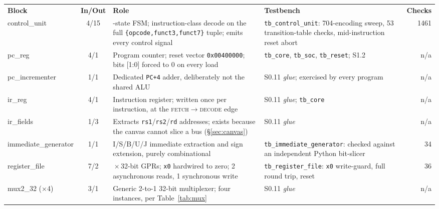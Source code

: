 \documentclass[11pt,a4paper]{article}
\newcommand{\ub}{\_\discretionary{}{}{}}     %
\newcommand{\hrow}{\rowcolor{rvbltint}}
\begin{document}
\begin{minipage}{\linewidth}
\label{tab:modules}
\vspace{3pt}

{\footnotesize
\begin{tabularx}{\linewidth}{>{\ttfamily\scriptsize}p{2.05cm}c>{\raggedright\arraybackslash}X>{\raggedright\arraybackslash}p{4.35cm}r}
\multicolumn{5}{l}{\normalsize\bfseries\color{rvbl}Table \thetable a\quad
  Control and instruction-issue blocks}\\[2pt]
\toprule
\hrow \normalfont\bfseries Block & \bfseries In/Out & \bfseries Role &
\bfseries Testbench & \bfseries Checks \\
\midrule
control\ub unit & 4/15 & 6-state FSM; instruction-class decode on the full
  \texttt{\{opcode,funct3,funct7\}} tuple; emits every control signal &
  \texttt{tb\_control\_unit}: 704-encoding sweep, 53 transition-table checks,
  mid-instruction reset abort & 1461 \\
pc\_reg & 4/1 & Program counter; reset vector \texttt{0x00400000}; bits [1:0] forced to 0
  on every load & \texttt{tb\_core}, \texttt{tb\_soc}, \texttt{tb\_reset}; S1.2 & n/a \\
pc\ub incrementer & 1/1 & Dedicated \texttt{PC+4} adder, deliberately not the shared ALU &
  S0.11 \emph{glue}; exercised by every program & n/a \\
ir\_reg & 4/1 & Instruction register; written once per instruction, at the
  \textsc{fetch}$\to$\textsc{decode} edge & S0.11 \emph{glue}; \texttt{tb\_core} & n/a \\
ir\_fields & 1/3 & Extracts \texttt{rs1}/\texttt{rs2}/\texttt{rd} addresses; exists because
  the canvas cannot slice a bus (\S\ref{sec:canvas}) & S0.11 \emph{glue} & n/a \\
immediate\ub generator & 1/1 & I/S/B/U/J immediate extraction and sign extension, purely
  combinational & \texttt{tb\_immediate\_generator}: checked against an independent
  Python bit-slicer & 34 \\
register\ub file & 7/2 & 32\,$\times$\,32-bit GPRs; \texttt{x0} hardwired to zero; 2
  asynchronous reads, 1 synchronous write & \texttt{tb\_register\_file}: \texttt{x0}
  write-guard, full round trip, reset & 36 \\
mux2\_32 ($\times$4) & 3/1 & Generic 2-to-1 32-bit multiplexer; four instances, per
  Table~\ref{tab:mux} & S0.11 \emph{glue} & n/a \\
\bottomrule
\end{tabularx}}
\end{minipage}
\end{document}
